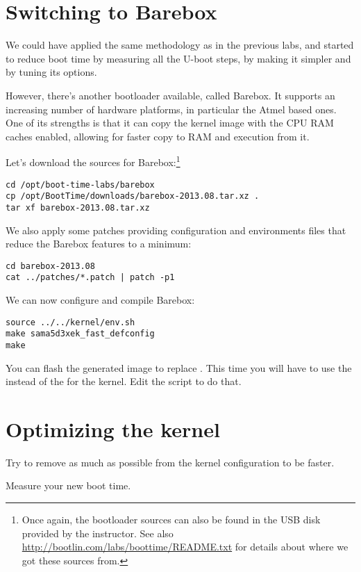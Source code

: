 
\section{Switching to Barebox}

We could have applied the same methodology as in the previous labs, and
started to reduce boot time by measuring all the U-boot steps, by making
it simpler and by tuning its options.

However, there's another bootloader available, called Barebox. It
supports an increasing number of hardware platforms, in particular the
Atmel based ones. One of its strengths is that it can copy the kernel
image with the CPU RAM caches enabled, allowing for faster copy to RAM
and execution from it.

Let's download the sources for Barebox:\footnote{Once again, the
bootloader sources can also be found in the USB disk provided by
the instructor. See also \url{http://bootlin.com/labs/boottime/README.txt}
for details about where we got these sources from.}

\begin{verbatim}
cd /opt/boot-time-labs/barebox
cp /opt/BootTime/downloads/barebox-2013.08.tar.xz .
tar xf barebox-2013.08.tar.xz
\end{verbatim}

We also apply some patches providing configuration and environments files
that reduce the Barebox features to a minimum:

\begin{verbatim}
cd barebox-2013.08
cat ../patches/*.patch | patch -p1
\end{verbatim}

We can now configure and compile Barebox:

\begin{verbatim}
source ../../kernel/env.sh
make sama5d3xek_fast_defconfig
make
\end{verbatim}

You can flash the generated image  to
replace . This time you will have to use the
 instead of the  for the kernel. Edit the
 script to do that.

\section{Optimizing the kernel}

Try to remove as much as possible from the kernel configuration to be
faster.

Measure your new boot time.
